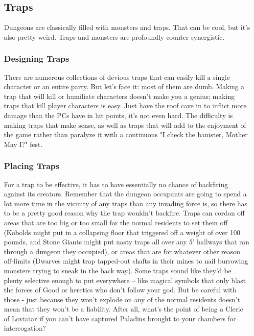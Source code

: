 \subsection{Traps}
\vspace*{-8pt}

Dungeons are classically filled with monsters and traps. That can be cool, but it's also pretty weird. Traps and monsters are profoundly counter synergistic.

\subsubsection{Designing Traps}

There are numerous collections of devious traps that can easily kill a single character or an entire party. But let's face it: most of them are dumb. Making a trap that will kill or humiliate characters doesn't make you a genius; making traps that kill player characters is easy. Just have the roof cave in to inflict more damage than the PCs have in hit points, it's not even hard. The difficulty is making traps that make sense, as well as traps that will add to the enjoyment of the game rather than paralyze it with a continuous "I check the banister, Mother May I?" fest.

\subsubsection{Placing Traps}

For a trap to be effective, it has to have essentially no chance of backfiring against its creators. Remember that the dungeon occupants are going to spend a lot more time in the vicinity of any traps than any invading force is, so there has to be a pretty good reason why the trap wouldn't backfire. Traps can cordon off areas that are too big or too small for the normal residents to set them off (Kobolds might put in a collapsing floor that triggered off a weight of over 100 pounds, and Stone Giants might put nasty traps all over any 5' hallways that ran through a dungeon they occupied), or areas that are for whatever other reason off-limits (Dwarves might trap tapped-out shafts in their mines to nail burrowing monsters trying to sneak in the back way). Some traps sound like they'd be plenty selective enough to put everywhere -- like magical symbols that only blast the forces of Good or heretics who don't follow your god. But be careful with those - just because they won't explode on any of the normal residents doesn't mean that they won't be a liability. After all, what's the point of being a Cleric of Loviatar if you can't have captured Paladins brought to your chambers for interrogation?

